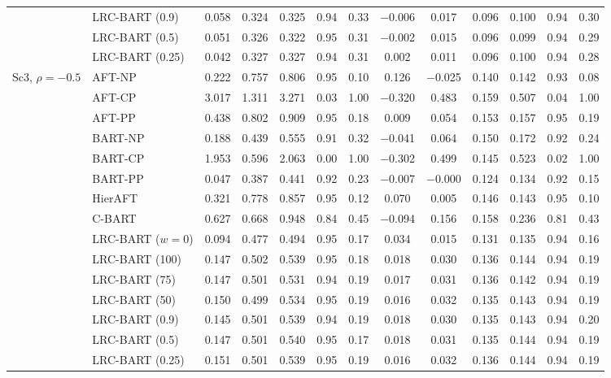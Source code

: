 \begin{center}
\begin{longtable}{llccccccccccc}
& LRC-BART (0.9) & 0.058 & 0.324 & 0.325 & 0.94 & 0.33 & $-$0.006 & 0.017 & 0.096 & 0.100 & 0.94 & 0.30 \\
& LRC-BART (0.5) & 0.051 & 0.326 & 0.322 & 0.95 & 0.31 & $-$0.002 & 0.015 & 0.096 & 0.099 & 0.94 & 0.29 \\
& LRC-BART (0.25) & 0.042 & 0.327 & 0.327 & 0.94 & 0.31 & 0.002 & 0.011 & 0.096 & 0.100 & 0.94 & 0.28 \\
\midrule
\multirow{15}{*}{Sc3, $\rho=-0.5$} & AFT-NP & 0.222 & 0.757 & 0.806 & 0.95 & 0.10 & 0.126 & $-$0.025 & 0.140 & 0.142 & 0.93 & 0.08 \\
& AFT-CP & 3.017 & 1.311 & 3.271 & 0.03 & 1.00 & $-$0.320 & 0.483 & 0.159 & 0.507 & 0.04 & 1.00 \\
& AFT-PP & 0.438 & 0.802 & 0.909 & 0.95 & 0.18 & 0.009 & 0.054 & 0.153 & 0.157 & 0.95 & 0.19 \\
& BART-NP & 0.188 & 0.439 & 0.555 & 0.91 & 0.32 & $-$0.041 & 0.064 & 0.150 & 0.172 & 0.92 & 0.24 \\
& BART-CP & 1.953 & 0.596 & 2.063 & 0.00 & 1.00 & $-$0.302 & 0.499 & 0.145 & 0.523 & 0.02 & 1.00 \\
& BART-PP & 0.047 & 0.387 & 0.441 & 0.92 & 0.23 & $-$0.007 & $-$0.000 & 0.124 & 0.134 & 0.92 & 0.15 \\
& HierAFT & 0.321 & 0.778 & 0.857 & 0.95 & 0.12 & 0.070 & 0.005 & 0.146 & 0.143 & 0.95 & 0.10 \\
& C-BART & 0.627 & 0.668 & 0.948 & 0.84 & 0.45 & $-$0.094 & 0.156 & 0.158 & 0.236 & 0.81 & 0.43 \\
& LRC-BART ($w=0$) & 0.094 & 0.477 & 0.494 & 0.95 & 0.17 & 0.034 & 0.015 & 0.131 & 0.135 & 0.94 & 0.16 \\
& LRC-BART (100) & 0.147 & 0.502 & 0.539 & 0.95 & 0.18 & 0.018 & 0.030 & 0.136 & 0.144 & 0.94 & 0.19 \\
& LRC-BART (75) & 0.147 & 0.501 & 0.531 & 0.94 & 0.19 & 0.017 & 0.031 & 0.136 & 0.142 & 0.94 & 0.19 \\
& LRC-BART (50) & 0.150 & 0.499 & 0.534 & 0.95 & 0.19 & 0.016 & 0.032 & 0.135 & 0.143 & 0.94 & 0.19 \\
& LRC-BART (0.9) & 0.145 & 0.501 & 0.539 & 0.94 & 0.19 & 0.018 & 0.030 & 0.135 & 0.143 & 0.94 & 0.20 \\
& LRC-BART (0.5) & 0.147 & 0.501 & 0.540 & 0.95 & 0.17 & 0.018 & 0.031 & 0.135 & 0.144 & 0.94 & 0.19 \\
& LRC-BART (0.25) & 0.151 & 0.501 & 0.539 & 0.95 & 0.19 & 0.016 & 0.032 & 0.136 & 0.144 & 0.94 & 0.19 \\

\end{longtable}
\end{center}
